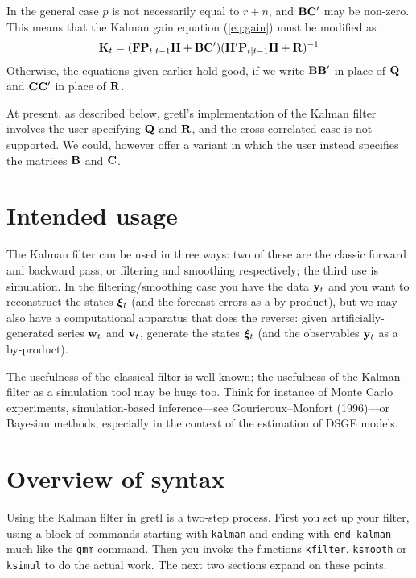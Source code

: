 \documentclass[a4paper]{article}
\newcommand{\obsvec}{\ensuremath\mathbf{y}}
\newcommand{\obsmat}{\ensuremath\mathbf{H}}
\newcommand{\obsdist}{\ensuremath\mathbf{w}}
\newcommand{\obsvar}{\ensuremath\mathbf{R}}
\newcommand{\statevec}{\ensuremath\mathbf{\bm \xi}}
\newcommand{\statemat}{\ensuremath\mathbf{F}}
\newcommand{\strdist}{\ensuremath\mathbf{v}}
\newcommand{\strvar}{\ensuremath\mathbf{Q}}
\newcommand{\statevar}{\ensuremath\mathbf{P}}
\newcommand{\gain}{\ensuremath\mathbf{K}}
\newcommand{\altstrvar}{\ensuremath\mathbf{B}}
\newcommand{\altobsvar}{\ensuremath\mathbf{C}}
\begin{document}
In the general case $p$ is not necessarily equal to $r+n$, and
$\altstrvar \altobsvar'$ may be non-zero.  This means that the
Kalman gain equation (\ref{eq:gain}) must be modified as
%
\[
\gain_t = (\statemat\statevar_{t|t-1}\obsmat + \altstrvar\altobsvar')
  (\obsmat'\statevar_{t|t-1}\obsmat + \obsvar)^{-1}
\]
%
Otherwise, the equations given earlier hold good, if we write
$\altstrvar\altstrvar'$ in place of $\strvar$ and
$\altobsvar\altobsvar'$ in place of $\obsvar$.

At present, as described below, gretl's implementation of the Kalman
filter involves the user specifying $\strvar$ and $\obsvar$, and the
cross-correlated case is not supported.  We could, however offer a
variant in which the user instead specifies the matrices $\altstrvar$
and $\altobsvar$.


\section{Intended usage}

The Kalman filter can be used in three ways: two of these are the
classic forward and backward pass, or filtering and smoothing
respectively; the third use is simulation.  In the
filtering/smoothing case you have the data $\obsvec_t$ and you want to
reconstruct the states $\statevec_t$ (and the forecast errors as a
by-product), but we may also have a computational apparatus that does
the reverse: given artificially-generated series $\obsdist_t$ and
$\strdist_t$, generate the states $\statevec_t$ (and the observables
$\obsvec_t$ as a by-product).

The usefulness of the classical filter is well known; the usefulness
of the Kalman filter as a simulation tool may be huge too. Think for
instance of Monte Carlo experiments, simulation-based inference---see
Gourieroux--Monfort (1996)---or Bayesian methods, especially in the
context of the estimation of DSGE models.

\section{Overview of syntax}

Using the Kalman filter in gretl is a two-step process.  First you set
up your filter, using a block of commands starting with
\texttt{kalman} and ending with \texttt{end kalman}---much like the
\texttt{gmm} command.  Then you invoke the functions \texttt{kfilter},
\texttt{ksmooth} or \texttt{ksimul} to do the actual work.  The next
two sections expand on these points.
\end{document}
